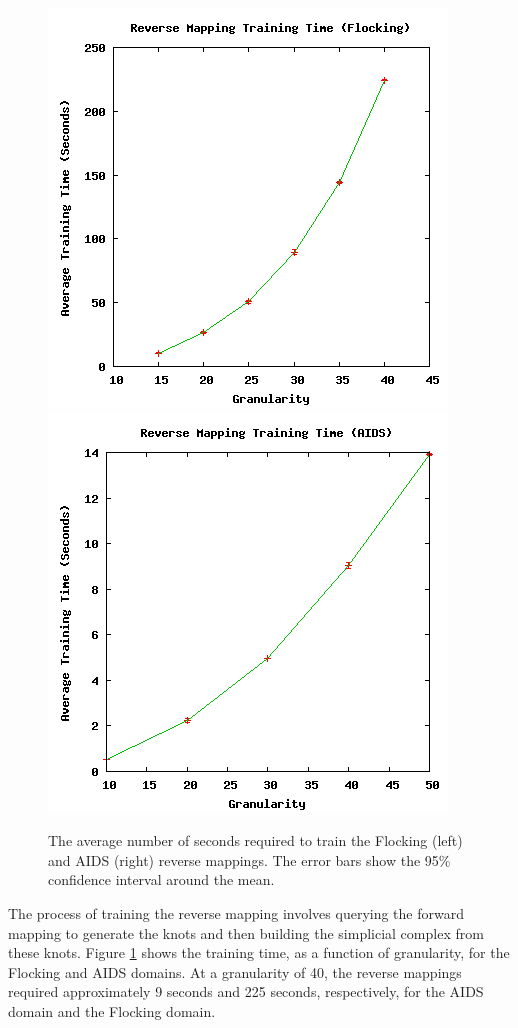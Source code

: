 \begin{figure}[ht]
\centering
\includegraphics[scale=.5]{images/results_flocking/rmtraining.png}
\includegraphics[scale=.5]{images/results_aids/aids-rmtraining.png}
\caption{The average number of seconds required to train the Flocking (left) and AIDS (right) reverse mappings.
The error bars show the 95\% confidence interval around the mean.}
\label{fig:farmtraining}
\end{figure}



The process of training the reverse mapping involves querying the forward mapping to generate the knots and then building the simplicial complex from these knots.
Figure \ref{fig:farmtraining} shows the training time, as a function of granularity, for the Flocking and AIDS domains.
At a granularity of 40, the reverse mappings required approximately 9 seconds and 225 seconds, respectively, for the AIDS domain and the Flocking domain.

